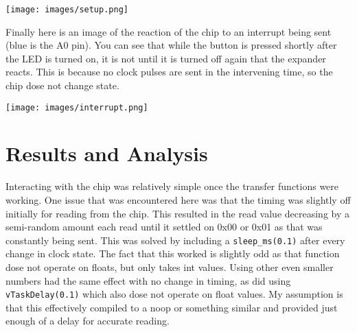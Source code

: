 \documentclass[sigconf]{article}
\begin{document}
\texttt{[image: images/setup.png]}

Finally here is an image of the reaction of the chip to an interrupt being sent (blue is the A0 pin). You can see that while the button is pressed shortly after the LED is turned on, it is not until it is turned off again that the expander reacts. This is because no clock pulses are sent in the intervening time, so the chip dose not change state.

\texttt{[image: images/interrupt.png]}

\section*{Results and Analysis}

Interacting with the chip was relatively simple once the transfer functions were working. One issue that was encountered here was that the timing was slightly off initially for reading from the chip. This resulted in the read value decreasing by a semi-random amount each read until it settled on 0x00 or 0x01 as that was constantly being sent. This was solved by including a \lstinline{sleep_ms(0.1)} after every change in clock state. The fact that this worked is slightly odd as that function dose not operate on floats, but only takes int values. Using other even smaller numbers had the same effect with no change in timing, as did using \lstinline{vTaskDelay(0.1)} which also dose not operate on float values. My assumption is that this effectively compiled to a noop or something similar and provided just enough of a delay for accurate reading. \\
\\
\end{document}
